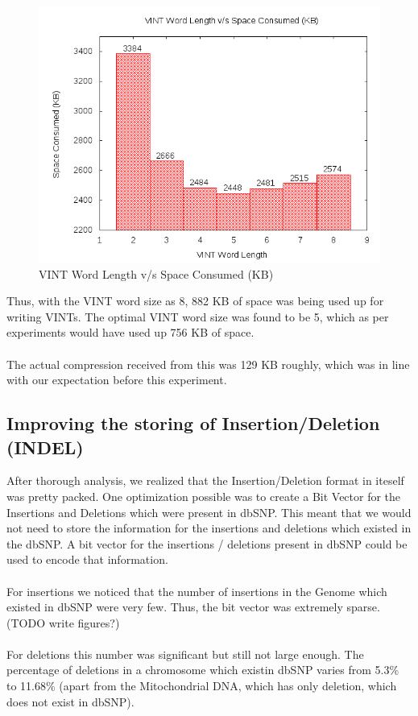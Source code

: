 \documentclass{article}
\begin{document}
\begin{figure}[htp]
\centering
\includegraphics[scale=0.4]{images/VINT.png}
\caption{VINT Word Length v/s Space Consumed (KB)}\label{fig:fs}
\end{figure}
\clearpage
Thus, with the VINT word size as 8, 882 KB of space was being used up for writing VINTs. The optimal VINT word size was found to be 5, which as per experiments would have used up 756 KB of space.\\
\\ 
The actual compression received from this was 129 KB roughly, which was in line with our expectation before this experiment.\\
\clearpage

\subsection {Improving the storing of Insertion/Deletion (INDEL)}
After thorough analysis, we realized that the Insertion/Deletion format in iteself was pretty packed. One optimization possible was to create a Bit Vector for the Insertions and Deletions which were present in dbSNP. This meant that we would not need to store the information for the insertions and deletions which existed in the dbSNP. A bit vector for the insertions / deletions present in dbSNP could be used to encode that information.\\ 
\\
For insertions we noticed that the number of insertions in the Genome which existed in dbSNP were very few. Thus, the bit vector was extremely sparse. (TODO write figures?) \\
\\
For deletions this number was significant but still not large enough. The percentage of deletions in a chromosome which existin dbSNP varies from 5.3\% to 11.68\% (apart from the Mitochondrial DNA, which has only deletion, which does not exist in dbSNP).
\end{document}
